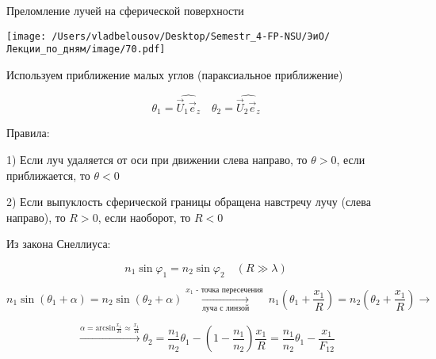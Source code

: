 \documentclass[12pt, a4paper]{report}
\begin{document}
Преломление лучей на сферической поверхности

\begin{center}
    \texttt{[image: /Users/vladbelousov/Desktop/Semestr\_4-FP-NSU/ЭиО/Лекции\_по\_дням/image/70.pdf]}
\end{center}



Используем приближение малых углов (параксиальное приближение)

\[ \theta_1 = \widehat{\vec{U } _1 \vec{e } _z }  \quad  \theta_2 = \widehat{\vec{U } _2 \vec{e } _z }     \] 

Правила:

1) Если луч удаляется от оси при движении слева направо, то \( \theta> 0  \), если приближается, то \( \theta<0 \) 

2) Если выпуклость сферической границы обращена  навстречу лучу (слева направо), то \( R>0 \), если наоборот, то \( R<0 \) 

Из закона Снеллиуса: 

\[ n_1 \sin \varphi_1 = n_2 \sin \varphi_2 \quad  (R \gg \lambda ) \] 

\[ n_1 \sin  (\theta_1 + \alpha ) = n_2 \sin (\theta_2 +\alpha ) \underset{\text{луча с линзой} }{\xrightarrow{x_1 \text{ - точка пересечения } }}    n_1\left( \theta_1 + \frac{x_1}{R}  \right) = n_2\left( \theta_2 + \frac{x_1}{R}  \right) \to   \]  

\[ \xrightarrow{\alpha = \mathrm{arcsin } \frac{x_1}{R } \approx \frac{x_1}{R}  } \theta_2 = \frac{n_1}{n_2 } \theta_1 - \left( 1 - \frac{n_1}{n_2}  \right) \frac{x_1}{R }  = \frac{n_1}{n_2 } \theta_1 - \frac{x_1}{F_{12}}      \] 


\ifdefined\mainfile
\else
    
\end{document}
